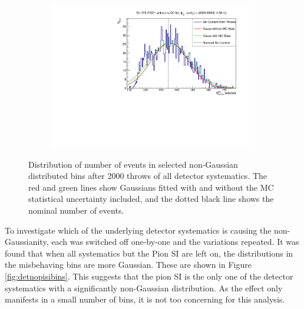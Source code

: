 \begin{figure}
\begin{subfigure}{.49\textwidth}
\end{subfigure}
\begin{subfigure}{.49\textwidth}
  \centering
  \includegraphics[width=0.95\linewidth]{figs/detbin_allsysts570}
\end{subfigure}
\caption{Distribution of number of events in selected non-Gaussian distributed bins after 2000 throws of all detector systematics. The red and green lines show Gaussians fitted with and without the MC statistical uncertainty included, and the dotted black line shows the nominal number of events.}
\label{fig:detnongaussbins}
\end{figure}

To investigate which of the underlying detector systematics is causing the non-Gaussianity, each was switched off one-by-one and the variations repeated. It was found that when all systematics but the Pion SI are left on, the distributions in the misbehaving bins are more Gaussian. These are shown in Figure \ref{fig:detnopisibins}. This suggests that the pion SI is the only one of the detector systematics with a significantly non-Gaussian distribution. As the effect only manifests in a small number of bins, it is not too concerning for this analysis.

